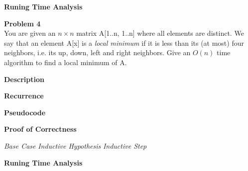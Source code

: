 \documentclass[12pt,article]{article}
\newenvironment{problem}[2][Problem]
    { \begin{mdframed}[backgroundcolor=gray!20] \textbf{#1 #2} \\}
    {  \end{mdframed}}
\begin{document}
\textbf{Runing Time Analysis}

\newpage
\begin{problem}{4} 
You are given an $n \times n$ matrix A[1..n, 1..n] where all elements are distinct. We say that an element A[x] is a \textit{local minimum} if it is less than its (at most) four neighbors, i.e. its up, down, left and right neighbors. Give an $O(n)$ time algorithm to find a local minimum of A.
\end{problem}

\textbf{Description}

\textbf{Recurrence}


\textbf{Pseudocode}


\textbf{Proof of Correctness}

\textit{Base Case}
\textit{Inductive Hypothesis}
\textit{Inductive Step}

\textbf{Runing Time Analysis}



\end{document}
